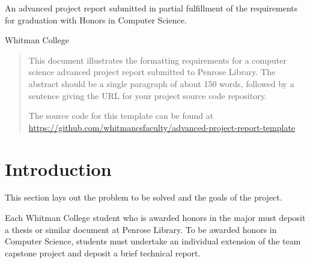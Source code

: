 \documentclass{article}
\begin{document}
\begin{titlepage}

\maketitle %
\thispagestyle{empty} %

\begin{centering}

An advanced project report submitted in partial fulfillment of the
requirements for graduation with Honors in Computer Science.

\vfill %

Whitman College

\the\year

\end{centering}
\end{titlepage}



\thispagestyle{empty}  %

\begin{abstract}
This document illustrates the formatting requirements for a computer science advanced project report submitted to Penrose Library. The abstract should be a single paragraph of about 150 words, followed by a sentence giving the URL for your project source code repository.

The source code for this template can be found at
\url{https://github.com/whitmancsfaculty/advanced-project-report-template}
\end{abstract}

\section{Introduction}

This section lays out the problem to be solved and the goals of the project.

Each Whitman College student who is awarded honors in the major must deposit a thesis or similar document at Penrose Library.  To be awarded honors in Computer Science, students must undertake an individual extension of the team capstone project and deposit a brief technical report.
\end{document}
